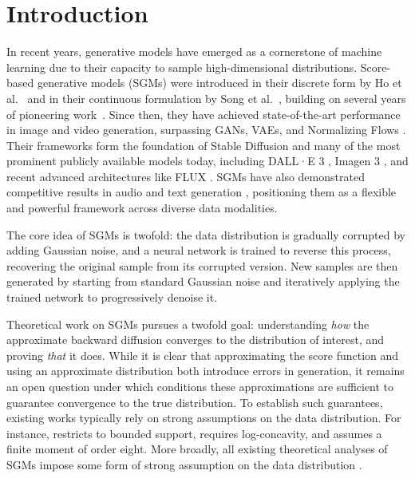 \section{Introduction}
In recent years, generative models have emerged as a cornerstone of machine learning due to their capacity to sample high-dimensional distributions.
Score-based generative models (SGMs) were introduced in their discrete form by Ho et al.~\citep{ho2020denoising} and in their continuous formulation by Song et al.~\citep{song2021scorebased}, building on several years of pioneering work~\citep{sohl2015deep, song2019generative}.
Since then, they have achieved state-of-the-art performance in image and video generation, surpassing GANs, VAEs, and Normalizing Flows \citep{dhariwal2021diffusionbeatGan, muller2022medfusion}. Their frameworks form the foundation of Stable Diffusion \citep{rombach2022high} and many of the most prominent publicly available models today, including DALL·E 3 \citep{Betker2023dalle3}, Imagen 3 \citep{Baldridge2024Imagen3}, and recent advanced architectures like FLUX \citep{blackForestLabs_FLUX1dev_2025}. SGMs have also demonstrated competitive results in audio \citep{chen2020wavegrad, kong2021diffwave} and text generation \citep{li2022diffusionlm, zou2023survey}, positioning them as a flexible and powerful framework across diverse data modalities.

The core idea of SGMs is twofold: the data distribution is gradually corrupted by adding Gaussian noise, and a neural network is trained to reverse this process, recovering the original sample from its corrupted version. New samples are then generated by starting from standard Gaussian noise and iteratively applying the trained network to progressively denoise it.

Theoretical work on SGMs pursues a twofold goal: understanding \textit{how} the approximate backward diffusion converges to the distribution of interest, and proving \textit{that} it does. While it is clear that approximating the score function and using an approximate distribution both introduce errors in generation, it remains an open question under which conditions these approximations are sufficient to guarantee convergence to the true distribution. To establish such guarantees, existing works typically rely on strong assumptions on the data distribution. For instance, \citep{debortoli2022convergence} restricts to bounded support, \citep{gao2025wasserstein} requires log-concavity, and \citep{conforti2023kl} assumes a finite moment of order eight. More broadly, all existing theoretical analyses of SGMs impose some form of strong assumption on the data distribution \citep{bruno2024wasserstein, silveri2025beyond, bortoli2021diffusion, strasman2025analysis}.

